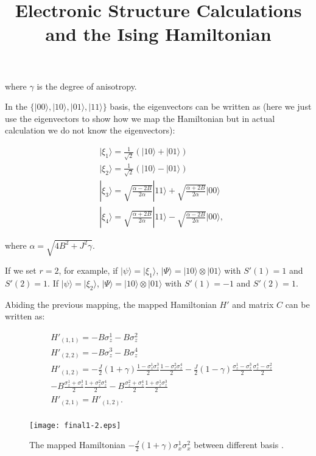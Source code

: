 \documentclass{article}
\newcommand\x[1]{\sigma_x^{#1}}
\newcommand\z[1]{\sigma_z^{#1}}\title{Electronic Structure Calculations and the Ising Hamiltonian}
\begin{document}
where $\gamma$ is the degree of anisotropy.

In the $\{|00\rangle,|10\rangle,|01\rangle,|11\rangle\}$ basis, the eigenvectors can be written as (here we just use the eigenvectors to show how we map the Hamiltonian but in actual calculation we do not know the eigenvectors):

\begin{equation}
\begin{aligned}
&|\xi_1\rangle=\frac{1}{\sqrt{2}}(|10\rangle+|01\rangle)\\
&|\xi_2\rangle=\frac{1}{\sqrt{2}}(|10\rangle-|01\rangle)\\
&|\xi_3\rangle=\sqrt{\frac{\alpha-2B}{2\alpha}}|11\rangle+\sqrt{\frac{\alpha+2B}{2\alpha}}|00\rangle\\
&|\xi_4\rangle=\sqrt{\frac{\alpha+2B}{2\alpha}}|11\rangle-\sqrt{\frac{\alpha-2B}{2\alpha}}|00\rangle ,
\end{aligned}
\end{equation}

where $\alpha=\sqrt{4B^2+J^2\gamma}$.

If we set $r=2$, for example, if $|\psi\rangle=|\xi_1\rangle$, $|\Psi\rangle=|10\rangle\otimes|01\rangle$ with $S'(1)=1$ and $S'(2)=1$. If $|\psi\rangle=|\xi_2\rangle$,
$|\Psi\rangle=|10\rangle\otimes|01\rangle$ with $S'(1)=-1$ and $S'(2)=1$.


Abiding the previous mapping, the mapped Hamiltonian $H'$ and matrix $C$ can be written as:

\begin{equation}
\begin{aligned}
&H'_{(1,1)}=-B\z{1}-B\z{2}\\
&H'_{(2,2)}=-B\z{3}-B\z{4}\\
&H'_{(1,2)}=-\frac{J}{2}(1+\gamma)\frac{1-\z{1}\z{3}}{2}\frac{1-\z{2}\z{4}}{2}-\frac{J}{2}(1-\gamma)\frac{\z{1}-\z{3}}{2}\frac{\z{4}-\z{2}}{2}\\
&-B\frac{\z{1}+\z{3}}{2}\frac{1+\z{2}\z{4}}{2}-B\frac{\z{2}+\z{4}}{2}\frac{1+\z{1}\z{3}}{2}\\
&H'_{(2,1)}= H'_{(1,2)} .\\
\end{aligned}
\end{equation}

\begin{figure}
\begin{center}
\texttt{[image: final1-2.eps]}
\caption{The mapped Hamiltonian $-\frac{J}{2}(1+\gamma)\x{1}\x{2}$ between different basis .}
\end{center}
\end{figure}
\end{document}

